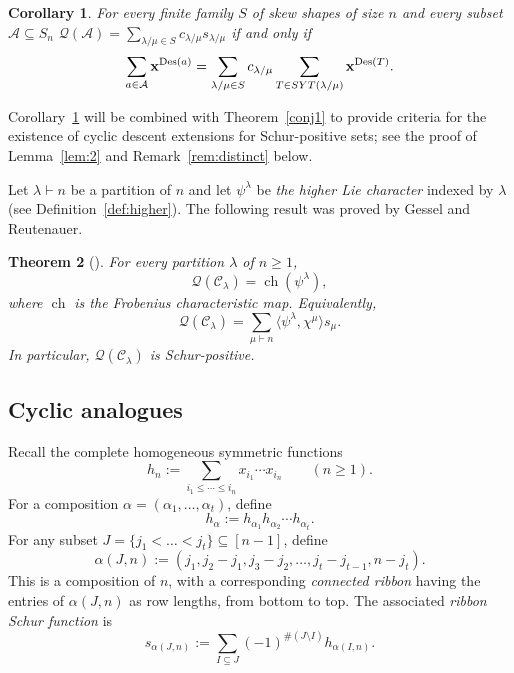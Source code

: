 \documentclass[10pt]{article}
\newtheorem{theorem}{Theorem}[section]
\newtheorem{corollary}[theorem]{Corollary}
\theoremstyle{definition}
\newcommand{\Q}{\mathcal Q}
\newcommand{\C}{\mathcal C}
\newcommand{\A}{\mathcal A}
\DeclareMathOperator\Des{Des}
\newcommand\comp[2]{\alpha{(#2,#1)}}
\newcommand{\ch}{{\operatorname{ch}}}
\def\SYT{{\rm SYT}}
\begin{document}
\begin{corollary}\label{cor:Schur-gf}
    For every finite family $S$ of skew shapes of size $n$  and every subset $\A\subseteq S_n$ 
    $\Q(\A)= \sum\limits_{\lambda/\mu\in S} c_{\lambda/\mu} s_{\lambda/\mu}$ 
    if and only if 
    \[
        \sum\limits_{a\in \A} {\bf x}^{\Des(a)}=\sum\limits_{\lambda/\mu\in S} c_{\lambda/\mu} 
        \sum\limits_{T\in \SYT(\lambda/\mu)}{\bf x}^{\Des(T)}. 
    \]
\end{corollary}

Corollary~\ref{cor:Schur-gf} will be combined with Theorem~\ref{conj1} to provide criteria for the existence of cyclic descent extensions for Schur-positive sets; see the proof of Lemma~\ref{lem:2} and Remark~\ref{rem:distinct} below.  

Let $\lambda \vdash n$ be a partition of $n$ and let $\psi^\lambda$ be {\em the higher Lie character} indexed by $\lambda$ (see Definition~\ref{def:higher}).
The following result was proved by Gessel and Reutenauer. 

\begin{theorem}[{\cite[Proof of Theorem 2.1]{GR}}]\label{thm:GR22}
	For every partition $\lambda$ of $n\ge 1$, 
	\[
		\Q(\C_\lambda) = \ch(\psi^\lambda),
	\]
	where $\ch$ is the Frobenius characteristic map.
    Equivalently,		
	\[
		\Q(\C_\lambda)=
		\sum\limits_{\mu \vdash n} 
		\langle \psi^\lambda, \chi^\mu  \rangle s_\mu.
	\]
	In particular, $\Q(\C_\lambda)$ is Schur-positive.
\end{theorem}


\subsection{Cyclic analogues}
\label{sec:prel2}
		
Recall the complete homogeneous symmetric functions
\[
    h_n := 
    \sum_{i_1\le \cdots\le i_n} x_{i_1} \cdots x_{i_n}
    \qquad (n \ge 1).
\]
For a composition $\alpha =(\alpha_1,\ldots,\alpha_t)$, define
\[
    h_\alpha :=
    h_{\alpha_1}h_{\alpha_2} \cdots h_{\alpha_t}. 
\]
For any subset $J=\{j_1  < \ldots < j_t\} \subseteq [n-1]$, define
\[
    \comp{n}{J} := 
    (j_1,j_2-j_1,j_3-j_2,\ldots,j_t-j_{t-1},n-j_t).
\]
This is a composition of $n$, with a corresponding {\em connected ribbon} having the entries of $\alpha(J,n)$ as row lengths, from bottom to top. 
The associated {\em ribbon Schur function} is
\[
    s_{\alpha(J,n)} :=
    \sum_{I \subseteq J} (-1)^{\#(J \setminus I)} h_{\comp{n}{I}}. 
\]
\end{document}
